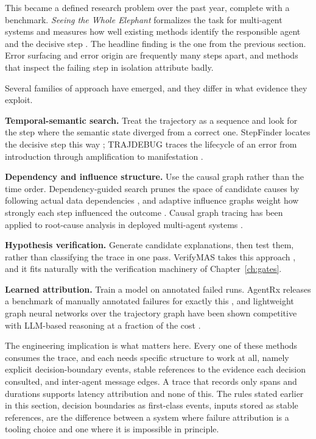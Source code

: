 This became a defined research problem over the past year, complete with a
benchmark. \emph{Seeing the Whole Elephant} formalizes the task for multi-agent
systems and measures how well existing methods identify the responsible agent and
the decisive step \cite{wholeelephant2026}. The headline finding is the one from
the previous section. Error surfacing and error origin are frequently many steps
apart, and methods that inspect the failing step in isolation attribute badly.

Several families of approach have emerged, and they differ in what evidence they
exploit.

\textbf{Temporal-semantic search.} Treat the trajectory as a sequence and look for
the step where the semantic state diverged from a correct one. StepFinder locates
the decisive step this way \cite{stepfinder2026}; TRAJDEBUG traces the lifecycle
of an error from introduction through amplification to manifestation
\cite{trajdebug2026}.

\textbf{Dependency and influence structure.} Use the causal graph rather than the
time order. Dependency-guided search prunes the space of candidate causes by
following actual data dependencies \cite{falat2026}, and adaptive influence graphs
weight how strongly each step influenced the outcome \cite{influencegraph2026}.
Causal graph tracing has been applied to root-cause analysis in deployed
multi-agent systems \cite{agenttracecausal2026}.

\textbf{Hypothesis verification.} Generate candidate explanations, then test them,
rather than classifying the trace in one pass. VerifyMAS takes this approach
\cite{verifymas2026}, and it fits naturally with the verification machinery of
Chapter~\ref{ch:gates}.

\textbf{Learned attribution.} Train a model on annotated failed runs. AgentRx
releases a benchmark of manually annotated failures for exactly this
\cite{agentrx2026}, and lightweight graph neural networks over the trajectory
graph have been shown competitive with LLM-based reasoning at a fraction of the
cost \cite{gnnattrib2026}.

The engineering implication is what matters here. Every one of these methods
consumes the trace, and each needs specific structure to work at all, namely explicit
decision-boundary events, stable references to the evidence each decision
consulted, and inter-agent message edges. A trace that records only spans and
durations supports latency attribution and none of this. The rules stated earlier
in this section, decision boundaries as first-class events, inputs stored as
stable references, are the difference between a system where failure
attribution is a tooling choice and one where it is impossible in principle.

